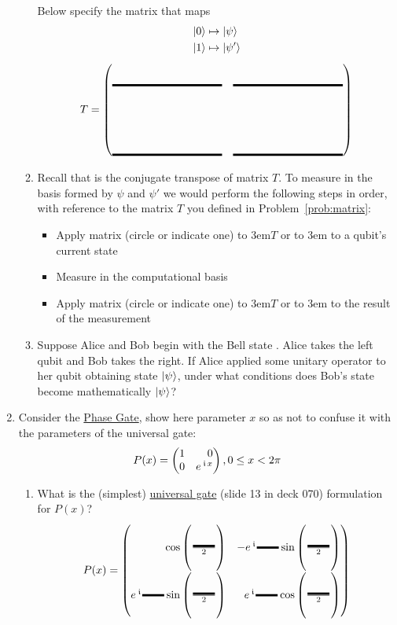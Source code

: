 \documentclass[12pt]{article}
\begin{document}
\begin{enumerate}
\begin{enumerate}[label=\theenumi.\arabic*]
Below specify the matrix that maps
\begin{align*}
    \ket{0} &\mapsto \ket{\psi} \\
    \ket{1} &\mapsto \ket{\psi'}
\end{align*}
\[
T = \begin{pmatrix*}[r]
\Blank[10em]{} & \Blank[10em]{} \\[4em]
\Blank[10em]{} & \Blank[10em]{}
\end{pmatrix*}
\]
\item Recall that  is the conjugate transpose of matrix $T$.  To measure in the basis formed by $\psi$ and $\psi'$ we would perform the following steps in order, with reference to the matrix $T$ you defined in Problem~\ref{prob:matrix}:
\begin{itemize}
    \item Apply matrix (circle or indicate one) \hbox to 3em{\hss$T$\hss} or \hbox to 3em{\hss{}\hss}  to a qubit's current state
    \item Measure in the computational basis
    \item Apply matrix (circle or indicate one) \hbox to 3em{\hss$T$\hss} or \hbox to 3em{\hss{}\hss}  to the result of the measurement
\end{itemize}
\item Suppose Alice and Bob begin with the Bell state . Alice takes the left qubit and Bob takes the right. If Alice applied some unitary operator  to her qubit obtaining state $\ket{\psi_{}}$, under what conditions does Bob's state become mathematically $\ket{\psi_{}}$?
\LeaveSpace{}
\end{enumerate}
\item Consider the \href{https://docs.quantum.ibm.com/api/qiskit/qiskit.circuit.library.PhaseGate}{Phase Gate}, show here parameter $x$ so as not to confuse it with the parameters of the universal  gate:
\[
P(x) = \SQBG{\relax}{1}{0}{0}{\ExpPhase{x}}, 0\leq x < 2\pi
\]
\begin{enumerate}[label=\theenumi.\arabic*]
  \item What is the (simplest) \href{https://docs.quantum.ibm.com/api/qiskit/qiskit.circuit.library.U3Gate}{universal gate} (slide 13 in deck 070) formulation for $P(x)$?
  \[
  P(x) = \SQBG{\relax}{\cos{\left(\frac{\Blank[2em]}{2}\right)}}{-\ExpPhase{\Blank[2em]}\sin{\left(\frac{\Blank[2em]}{2}\right)}}{\ExpPhase{\Blank[2em]}\sin{\left(\frac{\Blank[2em]}{2}\right)}}{\ExpPhase{\Blank[2em]}\cos{\left(\frac{\Blank[2em]}{2}\right)}}
\]
\end{enumerate}
\end{enumerate}
\end{document}
